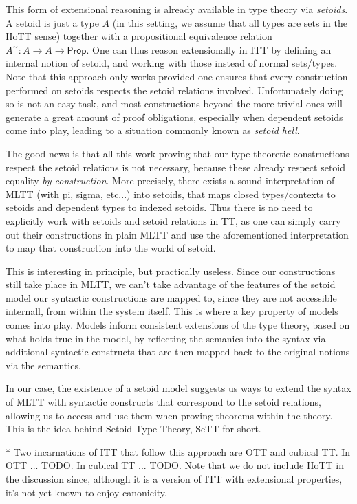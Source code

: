 \documentclass{easychair}
\newcommand{\Prop}{\textsf{Prop}}
\begin{document}
This form of extensional reasoning is already available in type theory via
\emph{setoids}. A setoid is just a type $A$ (in this setting, we assume that all
types are sets in the HoTT sense) together with a propositional equivalence
relation $A^\sim : A \to A \to \Prop$.
%
One can thus reason extensionally in ITT by defining an internal notion of
setoid, and working with those instead of normal sets/types. Note that this
approach only works provided one ensures that every construction performed on
setoids respects the setoid relations involved. Unfortunately doing so is not an
easy task, and most constructions beyond the more trivial ones will generate a
great amount of proof obligations, especially when dependent setoids come into
play, leading to a situation commonly known as \emph{setoid hell}.


The good news is that all this work proving that our type theoretic
constructions respect the setoid relations is not necessary, because these
already respect setoid equality \emph{by construction}. More precisely, there
exists a sound interpretation of MLTT (with pi, sigma, etc...) into setoids,
that maps closed types/contexts to setoids and dependent types to indexed
setoids.
%
Thus there is no need to explicitly work with setoids and setoid relations in
TT, as one can simply carry out their constructions in plain MLTT and use the
aforementioned interpretation to map that construction into the world of setoid.

This is interesting in principle, but practically useless. Since our
constructions still take place in MLTT, we can't take advantage of the features
of the setoid model our syntactic constructions are mapped to, since they are
not accessible internall, from within the system itself.
%
This is where a key property of models comes into play. Models inform consistent
extensions of the type theory, based on what holds true in the model, by
reflecting the semanics into the syntax via additional syntactic constructs that
are then mapped back to the original notions via the semantics.

In our case, the existence of a setoid model suggests us ways to extend the
syntax of MLTT with syntactic constructs that correspond to the setoid
relations, allowing us to access and use them when proving theorems within the
theory.
%
This is the idea behind Setoid Type Theory, SeTT for short.

* Two incarnations of ITT that follow this approach are OTT and cubical TT. In OTT
... TODO. In cubical TT ... TODO. Note that we do not include HoTT in the
discussion since, although it is a version of ITT with extensional properties,
it's not yet known to enjoy canonicity.
\end{document}
